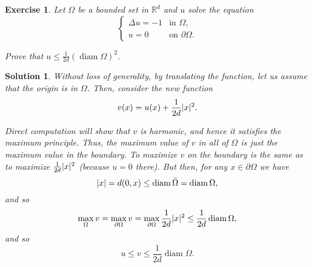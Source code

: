 \documentclass{article}
\newtheorem{ex}{Exercise}
\theoremstyle{nonumberplain}
\newtheorem{sol}{Solution}
\newcommand{\R}{\mathbb{R}}
\DeclarePairedDelimiter{\norm}{\lvert}{\rvert}
\newcommand{\lap}{\Delta}
\DeclareMathOperator{\diam}{diam}
\begin{document}
\begin{ex}
Let $\Omega$ be a bounded set in $\R^d$ and $u$ solve the equation
\begin{equation}
\begin{cases}
\lap u = -1 & \text{in $\Omega$},\\
u = 0 & \text{on $\partial \Omega$}.
\end{cases}
\end{equation}

Prove that $u \leq \frac1{2d} (\diam \Omega)^2$.
\end{ex}

\begin{sol}
Without loss of generality, by translating the function, let us assume that the origin is in $\Omega$. Then, consider the new function
\begin{equation}
v(x) = u(x) + \frac1{2d}\norm{x}^2.
\end{equation}

Direct computation will show that $v$ is harmonic, and hence it satisfies the maximum principle. Thus, the maximum value of $v$ in all of $\Omega$ is just the maximum value in the boundary. To maximize $v$ on the boundary is the same as to maximize $\frac1{2d} \norm{x}^2$ (because $u = 0$ there). But then, for any $x \in \partial \Omega$ we have
\begin{equation}
\norm{x} = d(0,x) \leq \diam \bar\Omega = \diam\Omega,
\end{equation}
and so
\begin{equation}
\max_\Omega v = \max_{\partial\Omega} v = \max_{\partial\Omega} \frac1{2d} \norm{x}^2 \leq \frac1{2d}\diam\Omega,
\end{equation}
and so
\begin{equation}
u \leq v \leq \frac1{2d}\diam\Omega.
\end{equation}
\end{sol}
\end{document}
